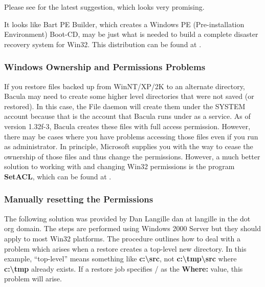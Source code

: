 Please see 
 for the latest
suggestion, which looks very promising. 

It looks like Bart PE Builder, which creates a Windows PE (Pre-installation
Environment) Boot-CD, may be just what is needed to build a complete disaster
recovery system for Win32. This distribution can be found at 
. 

\subsubsection*{Windows Ownership and Permissions Problems}

If you restore files backed up from WinNT/XP/2K to an alternate directory,
Bacula may need to create some higher level directories that were not saved
(or restored). In this case, the File daemon will create them under the SYSTEM
account because that is the account that Bacula runs under as a service. As of
version 1.32f-3, Bacula creates these files with full access permission.
However, there may be cases where you have problems accessing those files even
if you run as administrator. In principle, Microsoft supplies you with the way
to cease the ownership of those files and thus change the permissions.
However, a much better solution to working with and changing Win32 permissions
is the program {\bf SetACL}, which can be found at 
. 

\subsubsection*{Manually resetting the Permissions}

The following solution was provided by Dan Langille \lt{}dan at langille in
the dot org domain\gt{}. The steps are performed using Windows 2000 Server but
they should apply to most Win32 platforms. The procedure outlines how to deal
with a problem which arises when a restore creates a top-level new directory.
In this example, ``top-level'' means something like {\bf
c:\textbackslash{}src}, not {\bf c:\textbackslash{}tmp\textbackslash{}src}
where {\bf c:\textbackslash{}tmp} already exists. If a restore job specifies /
as the {\bf Where:} value, this problem will arise. 

